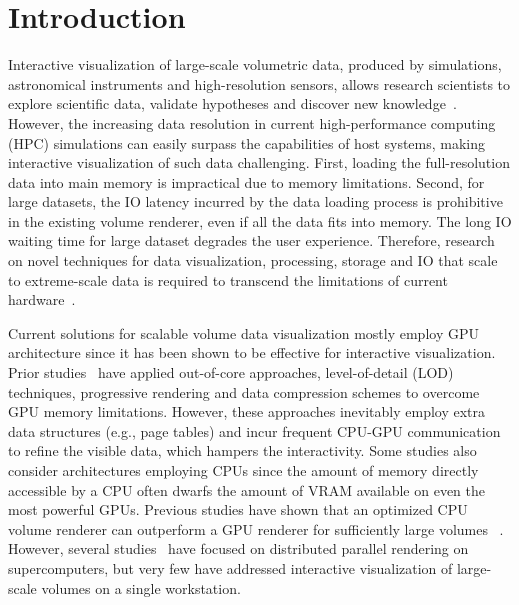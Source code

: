 


\maketitle

\section{Introduction}
\label{sec:introduction}
Interactive visualization of large-scale volumetric data, produced by
simulations, astronomical instruments and high-resolution sensors, 
allows research scientists to explore scientific data, validate
hypotheses and discover new knowledge~\cite{keim2013big}. 
However, the increasing data resolution in current high-performance
computing (HPC) simulations can easily surpass the capabilities of
host systems, making interactive visualization of such data challenging. 
First, loading the full-resolution data into main memory is impractical
due to memory limitations. Second, for large datasets, the IO latency incurred by the data 
loading process is prohibitive in the existing volume renderer,
even if all the data fits into memory.
The long IO waiting time for large dataset degrades the user experience.
Therefore, research on novel techniques for
data visualization, processing, storage and IO that scale to 
extreme-scale data is required to transcend the limitations
of current hardware~\cite{beyer2014survey}.



Current solutions for scalable volume data visualization mostly employ GPU architecture
since it has been shown to be effective for interactive visualization. 
Prior studies~\cite{crassin2009gigavoxels,engel2011cera,hadwiger2008interactive} 
have applied out-of-core approaches, level-of-detail (LOD) techniques,
progressive rendering and data compression schemes to overcome GPU memory limitations. 
However, these approaches inevitably employ extra data structures (e.g., page tables)
and incur frequent CPU-GPU communication to refine the visible data, which hampers the interactivity. Some studies also consider architectures employing CPUs since the amount 
of memory directly accessible by a CPU often dwarfs the amount of VRAM available on even
the most powerful GPUs. Previous studies have shown that an optimized CPU volume renderer 
can outperform a GPU renderer for sufficiently large volumes ~\cite{smelyanskiy2009,knoll2011full,wald2017ospray}. However, several studies~\cite{childs2006scalable,peterka2008parallel,howison2012hybrid}
have focused on distributed parallel rendering on supercomputers, but very few have addressed interactive visualization of large-scale volumes on a single workstation.



